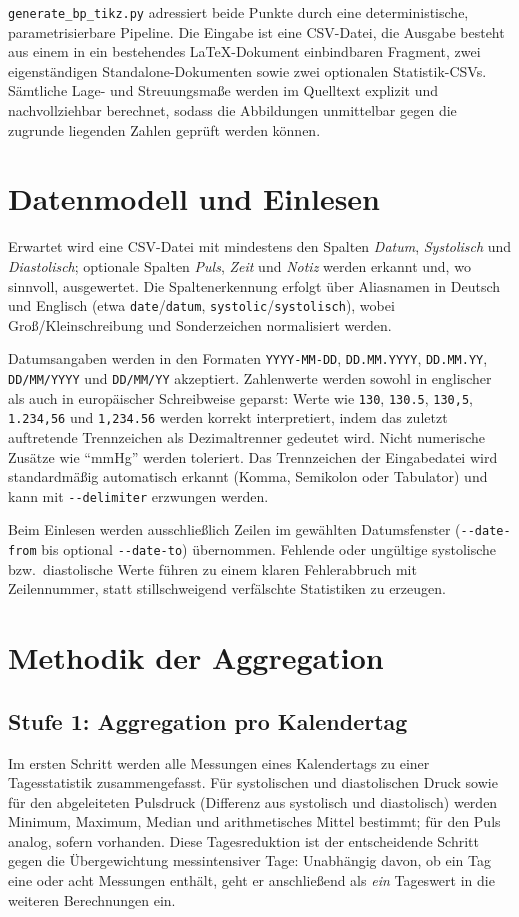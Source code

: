 \documentclass[conference]{IEEEtran}
\newcommand{\param}[1]{\texttt{#1}}
\begin{document}
\texttt{generate\_bp\_tikz.py} adressiert beide Punkte durch eine
deterministische, parametrisierbare Pipeline. Die Eingabe ist eine CSV-Datei,
die Ausgabe besteht aus einem in ein bestehendes LaTeX-Dokument einbindbaren
Fragment, zwei eigenständigen Standalone-Dokumenten sowie zwei optionalen
Statistik-CSVs. Sämtliche Lage- und Streuungsmaße werden im Quelltext explizit
und nachvollziehbar berechnet, sodass die Abbildungen unmittelbar gegen die
zugrunde liegenden Zahlen geprüft werden können.

\section{Datenmodell und Einlesen}
Erwartet wird eine CSV-Datei mit mindestens den Spalten \emph{Datum},
\emph{Systolisch} und \emph{Diastolisch}; optionale Spalten \emph{Puls},
\emph{Zeit} und \emph{Notiz} werden erkannt und, wo sinnvoll, ausgewertet. Die
Spaltenerkennung erfolgt über Aliasnamen in Deutsch und Englisch (etwa
\texttt{date}/\texttt{datum}, \texttt{systolic}/\texttt{systolisch}), wobei
Groß/Kleinschreibung und Sonderzeichen normalisiert werden.

Datumsangaben werden in den Formaten \texttt{YYYY-MM-DD}, \texttt{DD.MM.YYYY},
\texttt{DD.MM.YY}, \texttt{DD/MM/YYYY} und \texttt{DD/MM/YY} akzeptiert.
Zahlenwerte werden sowohl in englischer als auch in europäischer Schreibweise
geparst: Werte wie \texttt{130}, \texttt{130.5}, \texttt{130,5},
\texttt{1.234,56} und \texttt{1,234.56} werden korrekt interpretiert, indem das
zuletzt auftretende Trennzeichen als Dezimaltrenner gedeutet wird. Nicht
numerische Zusätze wie ``mmHg'' werden toleriert. Das Trennzeichen der
Eingabedatei wird standardmäßig automatisch erkannt (Komma, Semikolon oder
Tabulator) und kann mit \param{-{}-delimiter} erzwungen werden.

Beim Einlesen werden ausschließlich Zeilen im gewählten Datumsfenster
(\param{-{}-date-from} bis optional \param{-{}-date-to}) übernommen. Fehlende
oder ungültige systolische bzw.\ diastolische Werte führen zu einem klaren
Fehlerabbruch mit Zeilennummer, statt stillschweigend verfälschte Statistiken
zu erzeugen.

\section{Methodik der Aggregation}

\subsection{Stufe 1: Aggregation pro Kalendertag}
Im ersten Schritt werden alle Messungen eines Kalendertags zu einer
Tagesstatistik zusammengefasst. Für systolischen und diastolischen Druck sowie
für den abgeleiteten Pulsdruck (Differenz aus systolisch und diastolisch)
werden Minimum, Maximum, Median und arithmetisches Mittel bestimmt; für den
Puls analog, sofern vorhanden. Diese Tagesreduktion ist der entscheidende
Schritt gegen die Übergewichtung messintensiver Tage: Unabhängig davon, ob ein
Tag eine oder acht Messungen enthält, geht er anschließend als \emph{ein}
Tageswert in die weiteren Berechnungen ein.
\end{document}
